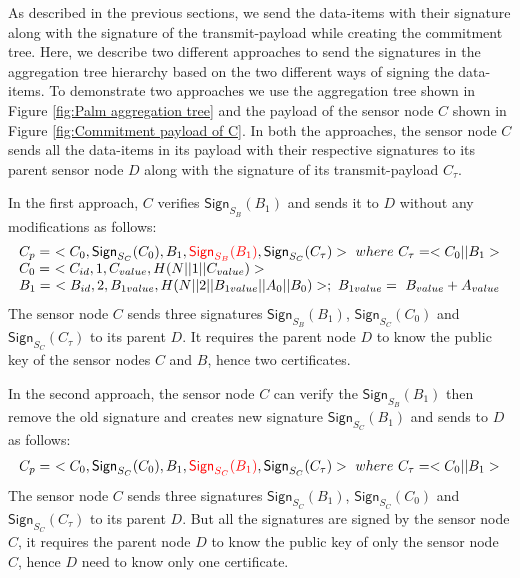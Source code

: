 	As described in the previous sections, we send the data-items with their signature along with the signature of the transmit-payload while creating the commitment tree.
	Here, we describe two different approaches to send the signatures in the aggregation tree hierarchy based on the two different ways of signing the data-items.
	To demonstrate two approaches we use the aggregation tree shown in Figure \ref{fig:Palm aggregation tree} and the payload of the sensor node $C$ shown in Figure \ref{fig:Commitment payload of C}.
	In both the approaches, the sensor node $C$ sends all the data-items in its payload with their respective signatures to its parent sensor node $D$ along with the signature of its transmit-payload $C_{\tau}$.

	In the first approach, $C$ verifies $\textsf{Sign}_{S_{B}}(B_{1})$ and sends it to $D$ without any modifications as follows:
	\begin{equation}	
		\begin{array}{l}
			C_{p} =\ <C_{0},\textsf{Sign}_{S_{C}}(C_{0}),B_{1},\textcolor{red}{\textsf{Sign}_{S_{B}}(B_{1})}, \textsf{Sign}_{S_{C}}(C_{\tau})>\ where\ C_{\tau} = <C_{0} || B_{1}>\\
			C_{0} =\ <C_{id}, 1, C_{value}, H(N||1||C_{value})>\\
			B_{1} =\ <B_{id}, 2, B_{1value}, H(N||2||B_{1value}||A_{0}||B_{0})>;\ B_{1value} =\ B_{value} + A_{value}
		\end{array}
		\label{eq:forwarding-payload-without-resigning}
	\end{equation}
	The sensor node $C$ sends three signatures $\textsf{Sign}_{S_{B}}(B_{1})$, $\textsf{Sign}_{S_{C}}(C_{0}) $ and $\textsf{Sign}_{S_{C}}(C_{\tau})$ to its parent $D$.
	It requires the parent node $D$ to know the public key of the sensor nodes $C$ and $B$, hence two certificates.

	In the second approach, the sensor node $C$ can verify the $\textsf{Sign}_{S_{B}}(B_{1})$ then remove the old signature and creates new signature $\textsf{Sign}_{S_{C}}(B_{1})$ and sends to $D$ as follows:
	\begin{equation}	
		\begin{array}{l}
			C_{p} =\ <C_{0},\textsf{Sign}_{S_{C}}(C_{0}),B_{1},\textcolor{red}{\textsf{Sign}_{S_{C}}(B_{1})}, \textsf{Sign}_{S_{C}}(C_{\tau})>\ where\ C_{\tau} = <C_{0} || B_{1}>\\
		\end{array}
		\label{eq:forwarding-payload-with-resigning}
	\end{equation}
	The sensor node $C$ sends three signatures $\textsf{Sign}_{S_{C}}(B_{1})$, $\textsf{Sign}_{S_{C}}(C_{0}) $ and $\textsf{Sign}_{S_{C}}(C_{\tau})$ to its parent $D$.
	But all the signatures are signed by the sensor node $C$, it requires the parent node $D$ to know the public key of only the sensor node $C$, hence $D$ need to know only one certificate.

